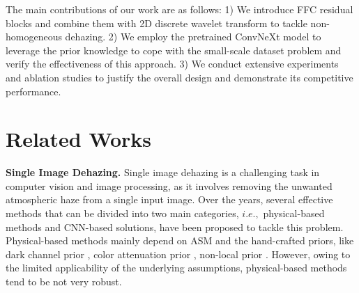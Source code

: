 \documentclass[10pt,twocolumn,letterpaper]{article}
\begin{document}
The main contributions of our work are as follows: 1) We introduce FFC residual blocks and combine them with 2D discrete wavelet transform to tackle non-homogeneous dehazing. 2) We employ the pretrained ConvNeXt model to leverage the prior knowledge to cope with the small-scale dataset problem and verify the effectiveness of this approach. 3) We conduct extensive experiments and  ablation studies to justify the overall design and demonstrate its competitive performance.

\section{Related Works}
\label{sec:rela}
\textbf{Single Image Dehazing.} Single image dehazing is a challenging task in computer vision and image processing, as it involves removing the unwanted atmospheric haze from a single input image. Over the years, several effective methods that can be divided into two main categories, $i.e.,$ physical-based methods and CNN-based solutions, have been proposed to tackle this problem.  Physical-based methods mainly depend on ASM \cite{ASM,ASM2} and the hand-crafted priors, like dark channel prior \cite{23}, color attenuation prior \cite{attenuation-prior}, non-local prior  \cite{nolocal-piror}. However, owing to the limited applicability of the underlying assumptions, physical-based methods tend to be not very robust.
\end{document}
